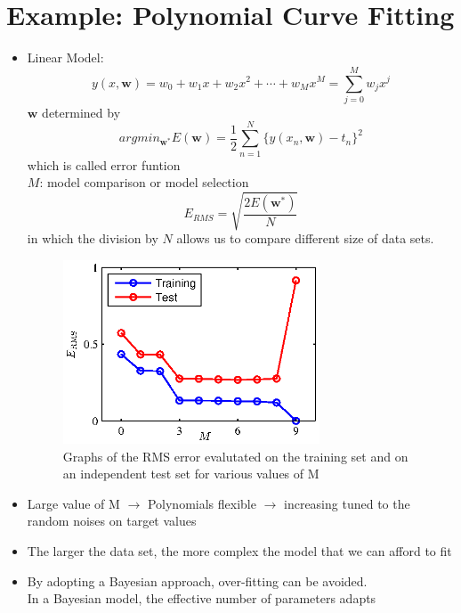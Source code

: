 \documentclass[UTF8]{article}
\begin{document}
    \section{Example: Polynomial Curve Fitting}
    \begin{itemize}
        \item Linear Model:
        \begin{equation}\label{equ:square}
            y(x,\bm{w})=w_0+w_1x+w_2x^2+\cdots+w_Mx^M=\sum_{j=0}^Mw_jx^j
        \end{equation}
        $\bm{w}$ determined by 
        \[
            argmin_{\bm{w}^*}E(\bm{w})=\frac{1}{2}\sum_{n=1}^N
            \{y(x_n,\bm{w})-t_n\}^2
        \]
        which is called error funtion\\
        $M$: model comparison or model selection\\
        \[
            E_{RMS}=\sqrt{\frac{2E(\bm{w}^*)}{N}}
            \]
        in which the division by $N$ allows us to compare different
        size of data sets.
        \begin{figure}[ht]
            \begin{center}
                \includegraphics[width=3in]{figures/Figure1_5.eps}
                \caption{Graphs of the RMS error evalutated on the training 
                set and on an independent test set for various values of M}
            \end{center}
        \end{figure}
        \item Large value of M $\rightarrow$ Polynomials 
        flexible $\rightarrow$ increasing tuned to the random
        noises on target values
        \item The larger the data set, the more complex the model that
        we can afford to fit
        \item By adopting a Bayesian approach, over-fitting can be avoided.\\
        In a Bayesian model, the effective number of parameters adapts

\end{itemize}
\end{document}
